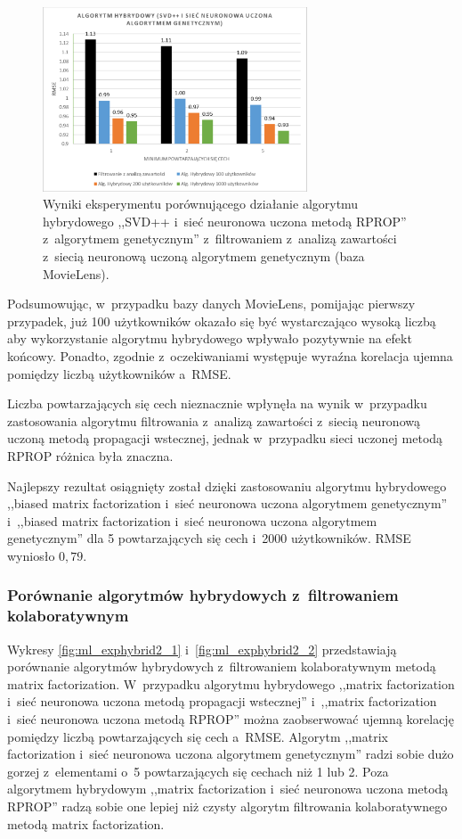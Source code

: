 \documentclass[twoside]{iisthesis}
\begin{document}
		\begin{figure}
			\centering
			\includegraphics[width=0.7\textwidth]{ml_exphybrid1_9}			
			\caption{Wyniki eksperymentu porównującego działanie algorytmu hybrydowego ,,SVD++ i~sieć neuronowa uczona metodą RPROP'' z~algorytmem genetycznym'' z~filtrowaniem z~analizą zawartości z~siecią neuronową uczoną algorytmem genetycznym (baza MovieLens).}
			\label{fig:ml_exphybrid1_9}
		\end{figure}
	
		Podsumowując, w~przypadku bazy danych MovieLens, pomijając pierwszy przypadek, już 100 użytkowników okazało się być wystarczająco wysoką liczbą aby wykorzystanie algorytmu hybrydowego wpływało pozytywnie na efekt końcowy. Ponadto, zgodnie z~oczekiwaniami występuje wyraźna korelacja ujemna pomiędzy liczbą użytkowników a~RMSE. 
		
		Liczba powtarzających się cech nieznacznie wpłynęła na wynik w~przypadku zastosowania algorytmu filtrowania z~analizą zawartości z~siecią neuronową uczoną metodą propagacji wstecznej, jednak w~przypadku sieci uczonej metodą RPROP różnica była znaczna. 
		
		Najlepszy rezultat osiągnięty został dzięki zastosowaniu algorytmu hybrydowego ,,biased matrix factorization i~sieć neuronowa uczona algorytmem genetycznym'' i~,,biased matrix factorization i~sieć neuronowa uczona algorytmem genetycznym'' dla 5 powtarzających się cech i~2000 użytkowników. RMSE wyniosło $0,79$.
		
		\subsubsection{Porównanie algorytmów hybrydowych z~filtrowaniem kolaboratywnym}
		
		Wykresy \ref{fig:ml_exphybrid2_1} i~\ref{fig:ml_exphybrid2_2} przedstawiają porównanie algorytmów hybrydowych z~filtrowaniem kolaboratywnym metodą matrix factorization. W~przypadku algorytmu hybrydowego ,,matrix factorization i~sieć neuronowa uczona metodą propagacji wstecznej'' i~,,matrix factorization i~sieć neuronowa uczona metodą RPROP'' można zaobserwować ujemną korelację pomiędzy liczbą powtarzających się cech a~RMSE. Algorytm ,,matrix factorization i~sieć neuronowa uczona algorytmem genetycznym'' radzi sobie dużo gorzej z~elementami o~5 powtarzających się cechach niż 1 lub 2. Poza algorytmem hybrydowym ,,matrix factorization i~sieć neuronowa uczona metodą RPROP'' radzą sobie one lepiej niż czysty algorytm filtrowania kolaboratywnego metodą matrix factorization.
		
\end{document}
